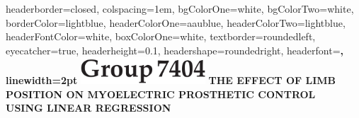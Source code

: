 \documentclass[landscape,a0paper,fontscale=0.375]{baposter} %
\begin{document}
\begin{poster}
{
headerborder=closed, %
colspacing=1em, %
bgColorOne=white, %
bgColorTwo=white, %
borderColor=lightblue, %
headerColorOne=aaublue, %
headerColorTwo=lightblue, %
headerFontColor=white, %
boxColorOne=white, %
textborder=roundedleft, %
eyecatcher=true, %
headerheight=0.1\textheight, %
headershape=roundedright, %
headerfont=\Large\bf\textsc, %
linewidth=2pt %
}
%
{\includegraphics[height=2.7em]{group7404.png}} %
{\bf \fontsize{1.5cm}{1.5cm} THE \hspace{3pt} EFFECT \hspace{3pt} OF \hspace{3pt} LIMB \hspace{3pt} POSITION \hspace{3pt} ON \hspace{3pt} MYOELECTRIC \hspace{3pt} PROSTHETIC \hspace{3pt} CONTROL\\ \vspace{0.2em} USING \hspace{3pt} LINEAR \hspace{3pt} REGRESSION \vspace{0.5em}} %

\end{poster}
\end{document}
